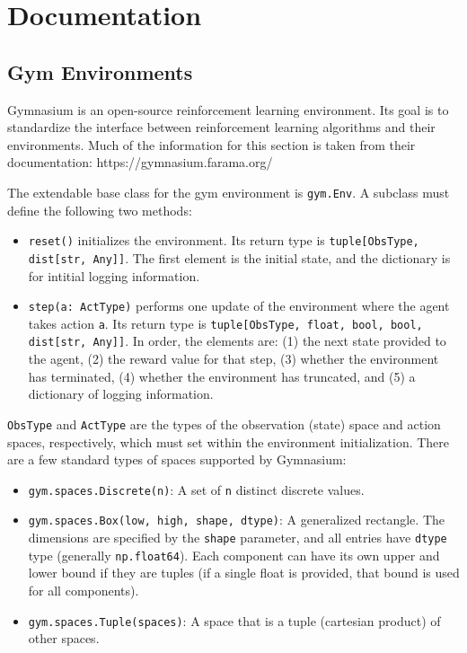 \chapter{Documentation}

\section{Gym Environments}

Gymnasium is an open-source reinforcement learning environment.
Its goal is to standardize the interface between reinforcement learning algorithms
and their environments.
Much of the information for this section is taken from their documentation: https://gymnasium.farama.org/

The extendable base class for the gym environment is \texttt{gym.Env}. A subclass must define the following two methods:
\begin{itemize}
  \item \texttt{reset()} initializes the environment. Its return type is \texttt{tuple[ObsType, dist[str, Any]]}.
  The first element is the initial state, and the dictionary is for intitial logging information.
  \item \texttt{step(a: ActType)} performs one update of the environment where the agent takes action \texttt{a}.
  Its return type is \texttt{tuple[ObsType, float, bool, bool, dist[str, Any]]}. In order, the elements are:
  (1) the next state provided to the agent, (2) the reward value for that step, (3) whether the environment has terminated,
  (4) whether the environment has truncated, and (5) a dictionary of logging information.
\end{itemize}

\texttt{ObsType} and \texttt{ActType} are the types of the observation (state) space and action spaces, respectively,
which must set within the environment initialization. There are a few standard types of spaces supported by Gymnasium:

\begin{itemize}
  \item \texttt{gym.spaces.Discrete(n)}: A set of \texttt{n} distinct discrete values.
  \item \texttt{gym.spaces.Box(low, high, shape, dtype)}: A generalized rectangle. The dimensions are
  specified by the \texttt{shape} parameter, and all entries have \texttt{dtype} type (generally \texttt{np.float64}). Each component
  can have its own upper and lower bound if they are tuples (if a single float is provided, that bound is used for all components).
  \item \texttt{gym.spaces.Tuple(spaces)}: A space that is a tuple (cartesian product) of other spaces.
\end{itemize}

